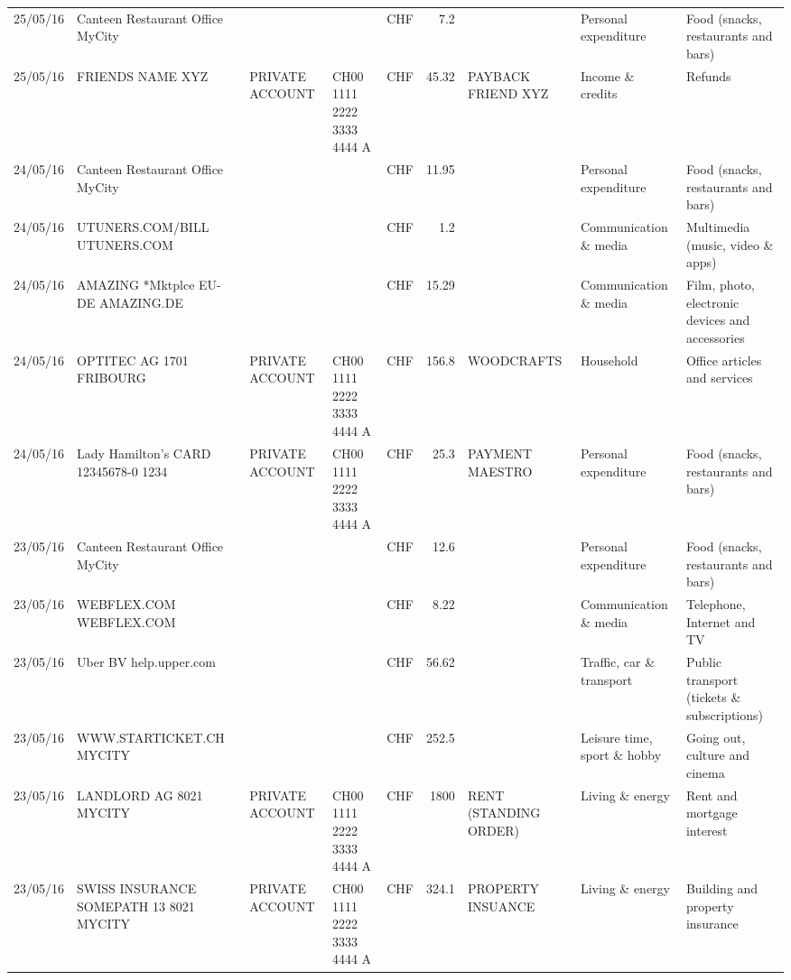 \begin{landscape}
\begin{table}[h]
\begin{center}
\begin{tabular}{rllllrlll}
		25/05/16 & Canteen Restaurant Office      MyCity &       &       & CHF   & 7.2   &       & Personal expenditure & Food (snacks, restaurants and bars) \\
		25/05/16 & FRIENDS NAME XYZ & PRIVATE ACCOUNT & CH00 1111 2222 3333 4444 A & CHF   & 45.32 & PAYBACK FRIEND XYZ & Income \& credits & Refunds \\
		24/05/16 & Canteen Restaurant Office      MyCity &       &       & CHF   & 11.95 &       & Personal expenditure & Food (snacks, restaurants and bars) \\
		24/05/16 & UTUNERS.COM/BILL          UTUNERS.COM &       &       & CHF   & 1.2   &       & Communication \& media & Multimedia (music, video \& apps) \\
		24/05/16 & AMAZING *Mktplce EU-DE    AMAZING.DE &       &       & CHF   & 15.29 &       & Communication \& media & Film, photo, electronic devices and accessories \\
		24/05/16 & OPTITEC AG 1701 FRIBOURG & PRIVATE ACCOUNT & CH00 1111 2222 3333 4444 A & CHF   & 156.8 & WOODCRAFTS & Household & Office articles and services \\
		24/05/16 & Lady Hamilton's CARD 12345678-0 1234 & PRIVATE ACCOUNT & CH00 1111 2222 3333 4444 A & CHF   & 25.3  & PAYMENT MAESTRO & Personal expenditure & Food (snacks, restaurants and bars) \\
		23/05/16 & Canteen Restaurant Office      MyCity &       &       & CHF   & 12.6  &       & Personal expenditure & Food (snacks, restaurants and bars) \\
		23/05/16 & WEBFLEX.COM              WEBFLEX.COM &       &       & CHF   & 8.22  &       & Communication \& media & Telephone,  Internet and TV \\
		23/05/16 & Uber BV                  help.upper.com &       &       & CHF   & 56.62 &       & Traffic, car \& transport & Public transport (tickets \& subscriptions) \\
		23/05/16 & WWW.STARTICKET.CH        MYCITY &       &       & CHF   & 252.5 &       & Leisure time, sport \& hobby & Going out, culture and cinema \\
		23/05/16 & LANDLORD AG 8021 MYCITY & PRIVATE ACCOUNT & CH00 1111 2222 3333 4444 A & CHF   & 1800  & RENT (STANDING ORDER) & Living \& energy & Rent and mortgage interest \\
		23/05/16 & SWISS INSURANCE SOMEPATH 13 8021 MYCITY & PRIVATE ACCOUNT & CH00 1111 2222 3333 4444 A & CHF   & 324.1 & PROPERTY INSUANCE & Living \& energy & Building and property insurance \\

\end{tabular}
\end{center}
\end{table}
\end{landscape}
